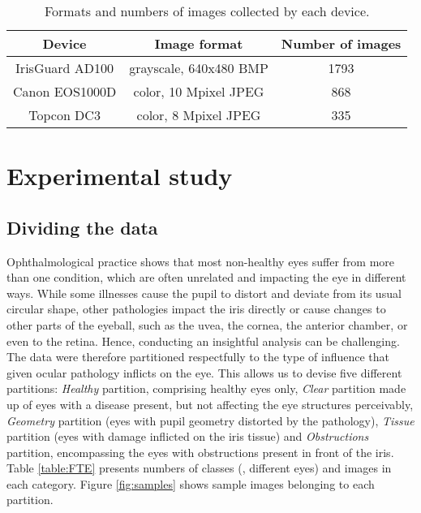 \documentclass[10pt,twocolumn,letterpaper]{article}
\begin{document}
\begin{table}[!ht]
\renewcommand{\arraystretch}{1.1}

\caption{Formats and numbers of images collected by each device.}
\label{table:database_summary}
\centering\footnotesize
\begin{tabular}[t]{|c|c|c|}
\hline
\textbf{Device} & \textbf{Image format} & \textbf{Number of images}\\
\hline
\hline
IrisGuard AD100 & grayscale, 640x480 BMP & 1793\\
\hline
Canon EOS1000D & color, 10 Mpixel JPEG & 868\\
\hline
Topcon DC3 & color, 8 Mpixel
 JPEG & 335\\
\hline
\end{tabular}
\end{table}


\section{Experimental study}
\label{sec:Experiment}

\subsection{Dividing the data}

Ophthalmological practice shows that most non-healthy eyes suffer from more than one condition, which are often unrelated and impacting the eye in different ways. While some illnesses cause the pupil to distort and deviate from its usual circular shape, other pathologies impact the iris directly or cause changes to other parts of the eyeball, such as the uvea, the cornea, the anterior chamber, or even to the retina. Hence, conducting an insightful analysis can be challenging. The data were therefore partitioned respectfully to the type of influence that given ocular pathology inflicts on the eye. This allows us to devise five different partitions: \emph{Healthy} partition, comprising healthy eyes only, \emph{Clear} partition made up of eyes with a disease present, but not affecting the eye structures perceivably, \emph{Geometry} partition (eyes with pupil geometry distorted by the pathology), \emph{Tissue} partition (eyes with damage inflicted on the iris tissue) and \emph{Obstructions} partition, encompassing the eyes with obstructions present in front of the iris. Table \ref{table:FTE} presents numbers of classes (\ie, different eyes) and images in each category. Figure \ref{fig:samples} shows sample images belonging to each partition.
\end{document}
